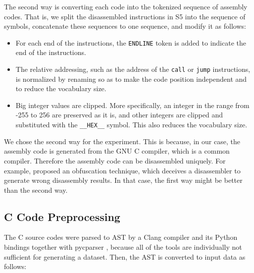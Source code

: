 \documentclass[11pt]{jarticle}
\begin{document}
The second way is converting each code into the tokenized sequence of assembly codes. 
That is, we split the disassembled instructions in S5 into the sequence of symbols, 
concatenate these sequences to one sequence, 
and modify it as follows:
\begin{itemize}
\item For each end of the instructions, the \texttt{ENDLINE} token is added to indicate the end of the instructions.
\item 
The relative addressing, such as the address of the \texttt{call} or \texttt{jump} instructions, 
is normalized by renaming so as to make the code position independent and to reduce the vocabulary size.
\item Big integer values are clipped. 
More specifically, an integer in the range from -255 to 256 are preserved as it is, and other integers are clipped and substituted with the \texttt{\_\_HEX\_\_} symbol.
This also reduces the vocabulary size.
\end{itemize}

We chose the second way for the experiment.
This is because, in our case, the assembly code is generated from the GNU C compiler, which is a common compiler.
Therefore the assembly code can be disassembled uniquely.
For example, \citet{disasm_obfuscate} proposed an obfuscation technique, which deceives a disassembler to generate wrong disassembly results.
In that case, the first way might be better than the second way.

\subsection{C Code Preprocessing}
The C source codes were parsed to AST by a Clang compiler \citep{clang} and its Python bindings together with pycparser \citep{pycparser}, 
because all of the tools are individually not sufficient for generating a dataset.
Then, the AST is converted to input data as follows:
\end{document}
